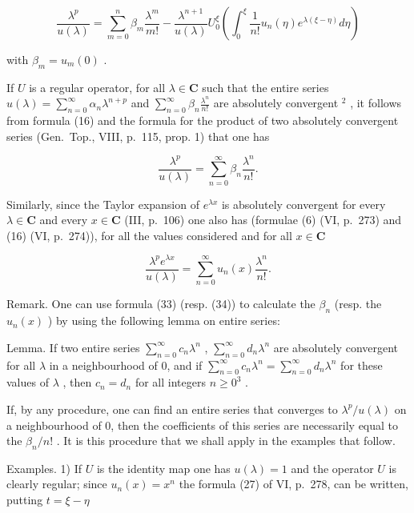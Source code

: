 \[
\frac {\lambda^ {p}}{u (\lambda)} = \sum_ {m = 0} ^ {n} \beta_ {m} \frac {\lambda^ {m}}{m !} - \frac {\lambda^ {n + 1}}{u (\lambda)} U _ {0} ^ {\xi} \left(\int_ {0} ^ {\xi} \frac {1}{n !} u _ {n} (\eta) e ^ {\lambda (\xi - \eta)} d \eta\right)\tag{32}
\]

with \(\beta_{m} = u_{m}(0)\) .

If \(U\) is a regular operator, for all \(\lambda \in \mathbf{C}\) such that the entire series \(u(\lambda) = \sum_{n=0}^{\infty} \alpha_n \lambda^{n+p}\) and \(\sum_{n=0}^{\infty} \beta_n \frac{\lambda^n}{n!}\) are absolutely convergent \(^2\) , it follows from formula (16) and the formula for the product of two absolutely convergent series (Gen.~Top., VIII, p.~115, prop. 1) that one has

\[
{\frac {\lambda^ {p}}{u (\lambda)}} = \sum_ {n = 0} ^ {\infty} \beta_ {n} {\frac {\lambda^ {n}}{n !}}.\tag{33}
\]

Similarly, since the Taylor expansion of \(e^{\lambda x}\) is absolutely convergent for every \(\lambda \in \mathbf{C}\) and every \(x \in \mathbf{C}\) (III, p.~106) one also has (formulae (6) (VI, p.~273) and (16) (VI, p.~274)), for all the values considered and for all \(x \in \mathbf{C}\)

\[
\frac {\lambda^ {p} e ^ {\lambda x}}{u (\lambda)} = \sum_ {n = 0} ^ {\infty} u _ {n} (x) \frac {\lambda^ {n}}{n !}.\tag{34}
\]

Remark. One can use formula (33) (resp. (34)) to calculate the \(\beta_{n}\) (resp. the \(u_{n}(x)\) ) by using the following lemma on entire series:

Lemma. If two entire series \(\sum_{n=0}^{\infty} c_n \lambda^n\) , \(\sum_{n=0}^{\infty} d_n \lambda^n\) are absolutely convergent for all \(\lambda\) in a neighbourhood of 0, and if \(\sum_{n=0}^{\infty} c_n \lambda^n = \sum_{n=0}^{\infty} d_n \lambda^n\) for these values of \(\lambda\) , then \(c_n = d_n\) for all integers \(n \geqslant 0^3\) .

If, by any procedure, one can find an entire series that converges to \(\lambda^p / u(\lambda)\) on a neighbourhood of 0, then the coefficients of this series are necessarily equal to the \(\beta_n / n!\) . It is this procedure that we shall apply in the examples that follow.

Examples. 1) If \(U\) is the identity map one has \(u(\lambda) = 1\) and the operator \(U\) is clearly regular; since \(u_{n}(x) = x^{n}\) the formula (27) of VI, p.~278, can be written, putting \(t = \xi - \eta\)

